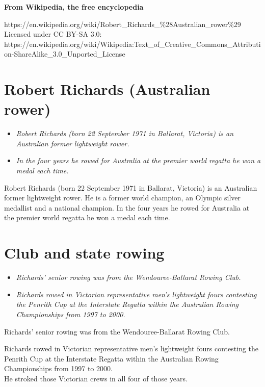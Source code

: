 \textbf{From Wikipedia, the free encyclopedia}

https://en.wikipedia.org/wiki/Robert\_Richards\_\%28Australian\_rower\%29\\
Licensed under CC BY-SA 3.0:\\
https://en.wikipedia.org/wiki/Wikipedia:Text\_of\_Creative\_Commons\_Attribution-ShareAlike\_3.0\_Unported\_License

\section{Robert Richards (Australian
rower)}\label{robert-richards-australian-rower}

\begin{itemize}
\item
  \emph{Robert Richards (born 22 September 1971 in Ballarat, Victoria)
  is an Australian former lightweight rower.}
\item
  \emph{In the four years he rowed for Australia at the premier world
  regatta he won a medal each time.}
\end{itemize}

Robert Richards (born 22 September 1971 in Ballarat, Victoria) is an
Australian former lightweight rower. He is a former world champion, an
Olympic silver medallist and a national champion. In the four years he
rowed for Australia at the premier world regatta he won a medal each
time.

\section{Club and state rowing}\label{club-and-state-rowing}

\begin{itemize}
\item
  \emph{Richards' senior rowing was from the Wendouree-Ballarat Rowing
  Club.}
\item
  \emph{Richards rowed in Victorian representative men's lightweight
  fours contesting the Penrith Cup at the Interstate Regatta within the
  Australian Rowing Championships from 1997 to 2000.}
\end{itemize}

Richards' senior rowing was from the Wendouree-Ballarat Rowing Club.

Richards rowed in Victorian representative men's lightweight fours
contesting the Penrith Cup at the Interstate Regatta within the
Australian Rowing Championships from 1997 to 2000.\\
He stroked those Victorian crews in all four of those years.

